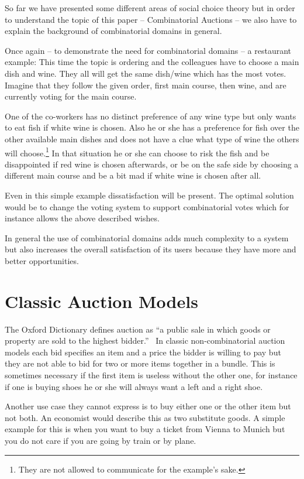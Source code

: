 \documentclass[a4paper]{paper}
\begin{document}
So far we have presented some different areas of social choice theory but in order to understand the topic of this paper -- Combinatorial Auctions -- we also have to explain the background of combinatorial domains in general.

Once again -- to demonstrate the need for combinatorial domains -- a restaurant example: This time the topic is ordering and the colleagues have to choose a main dish and wine. They all will get the same dish/wine which has the most votes. Imagine that they follow the given order, first main course, then wine, and are currently voting for the main course. 

One of the co-workers has no distinct preference of any wine type but only wants to eat fish if white wine is chosen. Also he or she has a preference for fish over the other available main dishes and does not have a clue what type of wine the others will choose.\footnote{They are not allowed to communicate for the example's sake.} In that situation he or she can choose to risk the fish and be disappointed if red wine is chosen afterwards, or be on the safe side by choosing a different main course and be a bit mad if white wine is chosen after all. 

Even in this simple example dissatisfaction will be present. The optimal solution would be to change the voting system to support combinatorial votes which for instance allows the above described wishes.

In general the use of combinatorial domains adds much complexity to a system but also increases the overall satisfaction of its users because they have more and better opportunities.

\section{Classic Auction Models}

The Oxford Dictionary defines auction as ``a public sale in which goods or property are sold to the highest bidder.''~\cite{OD:auction} 
In classic non-combinatorial auction models each bid specifies an item and a price the bidder is willing to pay but they are not able to bid for two or more items together in a bundle. This is sometimes necessary if the first item is useless without the other one, for instance if one is buying shoes he or she will always want a left and a right shoe.

Another use case they cannot express is to buy either one or the other item but not both. An economist would describe this as two substitute goods. A simple example for this is when you want to buy a ticket from Vienna to Munich but you do not care if you are going by train or by plane.
\end{document}
